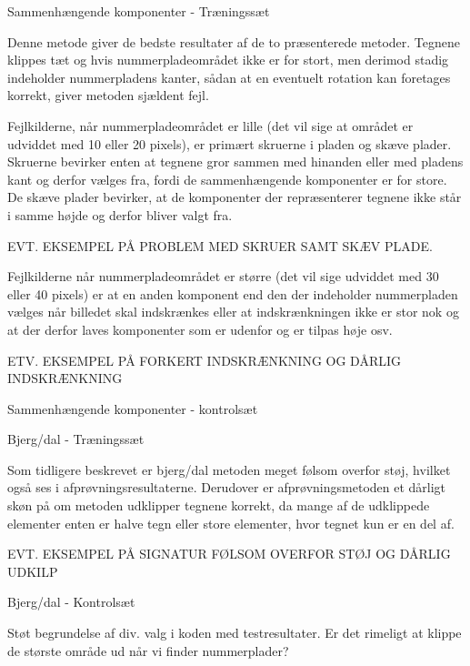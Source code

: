 
Sammenhængende komponenter - Træningssæt

Denne metode giver de bedste resultater af de to præsenterede metoder. Tegnene klippes tæt og hvis nummerpladeområdet ikke er for stort, men derimod stadig indeholder nummerpladens kanter, sådan at en eventuelt rotation kan foretages korrekt, giver metoden sjældent fejl.

Fejlkilderne, når nummerpladeområdet er lille (det vil sige at området er udviddet med 10 eller 20 pixels), er primært skruerne i pladen og skæve plader. Skruerne bevirker enten at tegnene gror sammen med hinanden eller med pladens kant og derfor vælges fra, fordi de sammenhængende komponenter er for store. De skæve plader bevirker, at de komponenter der repræsenterer tegnene ikke står i samme højde og derfor bliver valgt fra.

EVT. EKSEMPEL PÅ PROBLEM MED SKRUER SAMT SKÆV PLADE.

Fejlkilderne når nummerpladeområdet er større (det vil sige udviddet med 30 eller 40 pixels) er at en anden komponent end den der indeholder nummerpladen vælges når billedet skal indskrænkes eller at indskrænkningen ikke er stor nok og at der derfor laves komponenter som er udenfor og er tilpas høje osv.

ETV. EKSEMPEL PÅ FORKERT INDSKRÆNKNING OG DÅRLIG INDSKRÆNKNING

Sammenhængende komponenter - kontrolsæt

Bjerg/dal - Træningssæt

Som tidligere beskrevet er bjerg/dal metoden meget følsom overfor støj, hvilket også ses i afprøvningsresultaterne. Derudover er afprøvningsmetoden et dårligt skøn på om metoden udklipper tegnene korrekt, da mange af de udklippede elementer enten er halve tegn eller store elementer, hvor tegnet kun er en del af.

EVT. EKSEMPEL PÅ SIGNATUR FØLSOM OVERFOR STØJ OG DÅRLIG UDKILP

Bjerg/dal - Kontrolsæt

Støt begrundelse af div. valg i koden med testresultater. Er det rimeligt at klippe de største område ud når vi finder nummerplader? 


